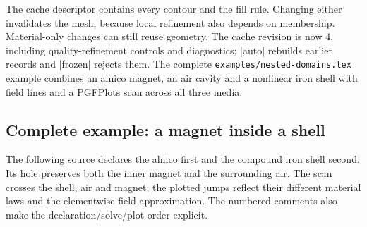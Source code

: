 The cache descriptor contains every contour and the fill rule. Changing
either invalidates the mesh, because local refinement also depends on
membership. Material-only changes can still reuse geometry. The cache
revision is now 4, including quality-refinement controls and diagnostics;
|auto| rebuilds earlier records and |frozen| rejects them.
The complete \texttt{examples/nested-domains.tex} example combines an alnico
magnet, an air cavity and a nonlinear iron shell with field lines and a
PGFPlots scan across all three media.

\subsection{Complete example: a magnet inside a shell}
The following source declares the alnico first and the compound iron
shell second. Its hole preserves both the inner magnet and the surrounding
air. The scan crosses the shell, air and magnet; the plotted jumps reflect
their different material laws and the elementwise field approximation.
The numbered comments also make the declaration/solve/plot order explicit.
